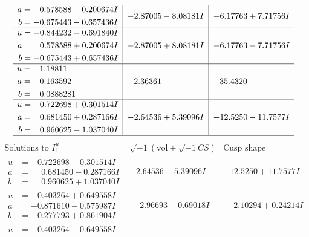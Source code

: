 \documentclass[1p]{elsarticle_modified}
\theoremstyle{definition}
\newcommand{\I}{\sqrt{-1}}
\begin{document}
$$\begin{array}{c|c|c}
\begin{aligned}
a &= \phantom{-}0.578588 - 0.200674 I \\
b &= -0.675443 - 0.657436 I\end{aligned}
 & -2.87005 - 8.08181 I & -6.17763 + 7.71756 I \\ \hline\begin{aligned}
u &= -0.844232 - 0.691840 I \\
a &= \phantom{-}0.578588 + 0.200674 I \\
b &= -0.675443 + 0.657436 I\end{aligned}
 & -2.87005 + 8.08181 I & -6.17763 - 7.71756 I \\ \hline\begin{aligned}
u &= \phantom{-}1.18811\phantom{ +0.000000I} \\
a &= -0.163592\phantom{ +0.000000I} \\
b &= \phantom{-}0.0888281\phantom{ +0.000000I}\end{aligned}
 & -2.36361\phantom{ +0.000000I} & \phantom{-}35.4320\phantom{ +0.000000I} \\ \hline\begin{aligned}
u &= -0.722698 + 0.301514 I \\
a &= \phantom{-}0.681450 + 0.287166 I \\
b &= \phantom{-}0.960625 - 1.037040 I\end{aligned}
 & -2.64536 + 5.39096 I & -12.5250 - 11.7577 I\\
 \hline 
 \end{array}$$\newpage$$\begin{array}{c|c|c}  
\text{Solutions to }I^u_{1}& \I (\text{vol} + \sqrt{-1}CS) & \text{Cusp shape}\\
 \hline 
\begin{aligned}
u &= -0.722698 - 0.301514 I \\
a &= \phantom{-}0.681450 - 0.287166 I \\
b &= \phantom{-}0.960625 + 1.037040 I\end{aligned}
 & -2.64536 - 5.39096 I & -12.5250 + 11.7577 I \\ \hline\begin{aligned}
u &= -0.403264 + 0.649558 I \\
a &= -0.871610 - 0.575987 I \\
b &= -0.277793 + 0.861904 I\end{aligned}
 & \phantom{-}2.96693 - 0.69018 I & \phantom{-}2.10294 + 0.24214 I \\ \hline\begin{aligned}
u &= -0.403264 - 0.649558 I \\

\end{aligned}
\end{array}$$
\end{document}
